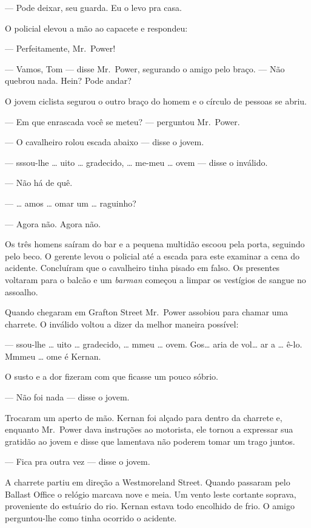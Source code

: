 --- Pode deixar, seu guarda.  Eu o levo pra casa.

O policial elevou a mão ao capacete e respondeu:

--- Perfeitamente, Mr.~Power!

--- Vamos, Tom --- disse Mr.~Power, segurando o amigo pelo braço.  --- Não
quebrou nada.  Hein?  Pode andar?

O jovem ciclista segurou o outro braço do homem e o círculo de pessoas se
abriu.

--- Em que enrascada você se meteu? --- perguntou Mr.~Power.

--- O cavalheiro rolou escada abaixo --- disse o jovem.

--- sssou-lhe \ldots{} uito \ldots{} gradecido, \ldots{} me-meu \ldots{} ovem ---
disse o inválido.

--- Não há de quê.

--- \ldots{} amos \ldots{} omar um \ldots{} raguinho?

--- Agora não.  Agora não.

Os três homens saíram do bar e a pequena multidão escoou pela porta, seguindo
pelo beco.  O gerente levou o policial até a escada para este examinar a cena
do acidente.  Concluíram que o cavalheiro tinha pisado em falso.  Os presentes
voltaram para o balcão e um \textit{barman} começou a limpar os vestígios de
sangue no assoalho.

Quando chegaram em Grafton Street Mr.~Power assobiou para chamar uma charrete.
O inválido voltou a dizer da melhor maneira possível:

--- ssou-lhe \ldots{} uito \ldots{} gradecido, \ldots{} mmeu \ldots{} ovem.
Gos\ldots{} aria de vol\ldots{} ar a \ldots{} ê-lo.  Mmmeu \ldots{} ome é Kernan.

O susto e a dor fizeram com que ficasse um pouco sóbrio.

--- Não foi nada --- disse o jovem.

Trocaram um aperto de mão.  Kernan foi alçado para dentro da charrete e,
enquanto Mr.~Power dava instruções ao motorista, ele tornou a expressar sua
gratidão ao jovem e disse que lamentava não poderem tomar um trago juntos.

--- Fica pra outra vez --- disse o jovem.

A charrete partiu em direção a Westmoreland Street.  Quando passaram pelo
Ballast Office o relógio marcava nove e meia.  Um vento leste cortante soprava,
proveniente do estuário do rio.  Kernan estava todo encolhido de frio.  O amigo
perguntou-lhe como tinha ocorrido o acidente.


